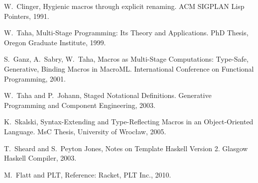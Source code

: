 \documentclass[10pt,journal,a4paper]{IEEEtran}
\begin{document}
\begin{thebibliography}{99}
W.~Clinger,
Hygienic macros through explicit renaming.
ACM SIGPLAN Lisp Pointers, 1991.

W.~Taha,
Multi-Stage Programming: Its Theory and Applications.
PhD Thesis, Oregon Graduate Institute, 1999.

S.~Ganz, A.~Sabry, W.~Taha,
Macros as Multi-Stage Computations: Type-Safe, Generative, Binding Macros in MacroML.
International Conference on Functional Programming, 2001.

W.~Taha and P.~Johann,
Staged Notational Definitions.
Generative Programming and Component Engineering, 2003.

K.~Skalski,
Syntax-Extending and Type-Reflecting Macros in an Object-Oriented Language.
MsC Thesis, University of Wroc{\l}aw, 2005.

T.~Sheard and S.~Peyton Jones,
Notes on Template Haskell Version 2.
Glasgow Haskell Compiler, 2003.

M.~Flatt and PLT,
Reference: Racket,
PLT Inc., 2010.

\end{thebibliography}
\end{document}
